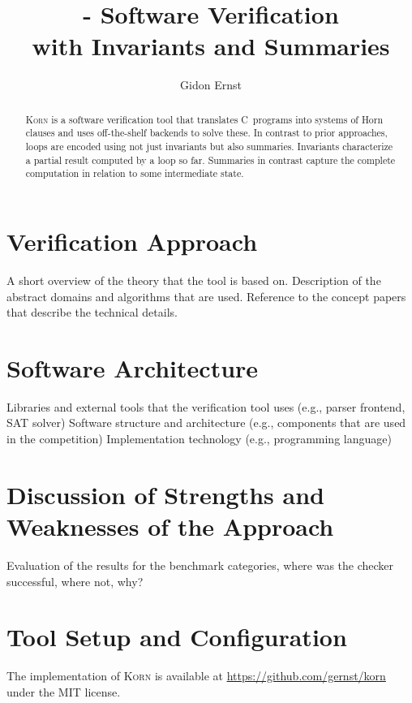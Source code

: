 \documentclass{llncs}
\author{Gidon Ernst}
\title{\Korn - Software Verification \\ with Invariants and Summaries}
\institute{LMU Munich \\ \mailto{gidon.ernst@lmu.de}}
\newcommand{\Korn}{\textsc{Korn}\xspace}
\begin{document}
\maketitle

\begin{abstract}
    \Korn is a software verification tool that translates
    C~programs into systems of Horn clauses
    and uses off-the-shelf backends to solve these.
    In contrast to prior approaches, loops are encoded using
    not just invariants but also summaries.
    Invariants characterize a partial result computed by a loop so far.
    Summaries in contrast capture the complete computation in relation to some intermediate state.
\end{abstract}

\section{Verification Approach}
\label{sec:approach}

\cite{hoare1969axiomatic}
A short overview of the theory that the tool is based on. Description of the abstract domains and algorithms that are used. Reference to the concept papers that describe the technical details.

\section{Software Architecture}
\label{sec:architecture}

    Libraries and external tools that the verification tool uses (e.g., parser frontend, SAT solver)
    Software structure and architecture (e.g., components that are used in the competition)
    Implementation technology (e.g., programming language)

\section{Discussion of Strengths and Weaknesses of the Approach}
\label{sec:discussion}

Evaluation of the results for the benchmark categories, where was the checker successful, where not, why?

\section{Tool Setup and Configuration}
\label{sec:project}

The implementation of \Korn is available at
    \url{https://github.com/gernst/korn} under the MIT license.
\end{document}
